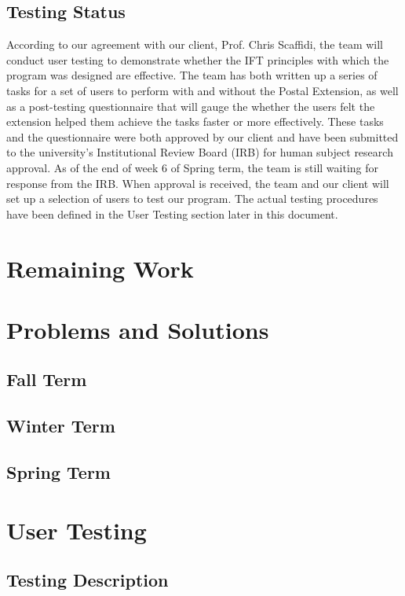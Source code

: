 \documentclass[letterpaper,10pt,titlepage,draftclsnofoot,onecolumn,onesided] {IEEEtran}
\begin{document}
	\subsection{Testing Status}
	According to our agreement with our client, Prof. Chris Scaffidi, the team will conduct user testing to demonstrate whether the IFT principles with which the program was designed are effective.
	The team has both written up a series of tasks for a set of users to perform with and without the Postal Extension, as well as a post-testing questionnaire that will gauge the whether the users felt the extension helped them achieve the tasks faster or more effectively.
	These tasks and the questionnaire were both approved by our client and have been submitted to the university's Institutional Review Board (IRB) for human subject research approval.
	As of the end of week 6 of Spring term, the team is still waiting for response from the IRB.
	When approval is received, the team and our client will set up a selection of users to test our program.
	The actual testing procedures have been defined in the User Testing section later in this document.
\section{Remaining Work}


\section{Problems and Solutions}
	\subsection{Fall Term}
	
	
	\subsection{Winter Term}
	
	
	\subsection{Spring Term}

\section{User Testing}
	\subsection{Testing Description}
	
\end{document}
